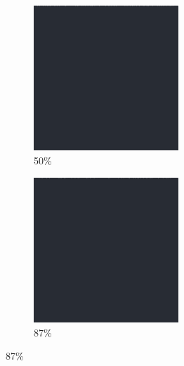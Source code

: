 \documentclass[12pt, fleqn]{report}                             %
\theoremstyle{break}                                            %
\begin{document}
\begin{figure}[ht!]
\begin{subfigure}[b]{0.4\linewidth}
          \includegraphics[width=0.6\textwidth]{Images/8/c.png}
          \caption{50\%}
        \end{subfigure}
        \begin{subfigure}[b]{0.4\linewidth}
          \includegraphics[width=0.6\textwidth]{Images/8/d.png}
          \caption{87\%}
        \end{subfigure}
      \end{figure}
\end{document}

